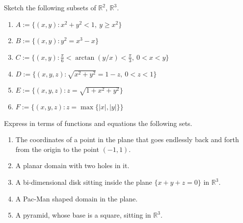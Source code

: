 \begin{exercise}
\label{ex:equations_to_drawings}
Sketch the following subsets of $\mathbb{R}^2$, $\mathbb{R}^3$.
\begin{enumerate}[label=\textbf{(\alph*)}]
  \item $A := \{(x,y) : x^2+y^2 < 1,\ y \geq x^2\}$
  \item $B := \{(x,y) : y^2 = x^3 - x\}$
  \item $C := \{(x,y) : \tfrac{\pi}{6} < \arctan(y/x) < \tfrac{\pi}{3},\ 0 < x < y\}$
  \item $D := \{(x,y,z) : \sqrt{x^2+y^2} = 1-z,\ 0 < z < 1\}$
  \item $E := \{(x,y,z) : z = \sqrt{1+x^2+y^2}\}$
  \item $F := \{(x,y,z) : z = \max\{|x|,|y|\}\}$
\end{enumerate}
\end{exercise}

\begin{exercise}
\label{ex:drawings_to_equations}
Express in terms of functions and equations the following sets.
\begin{enumerate}[label=\textbf{(\alph*)}]
  \item The coordinates of a point in the plane that goes endlessly back and forth from the
    origin to the point $(-1,1)$.
  \item A planar domain with two holes in it.
  \item A bi-dimensional disk sitting inside the plane $\{x+y+z=0\}$ in $\mathbb{R}^3$.
  \item A Pac-Man shaped domain in the plane.
  \item A pyramid, whose base is a square, sitting in $\mathbb{R}^3$.
\end{enumerate}
\end{exercise}
